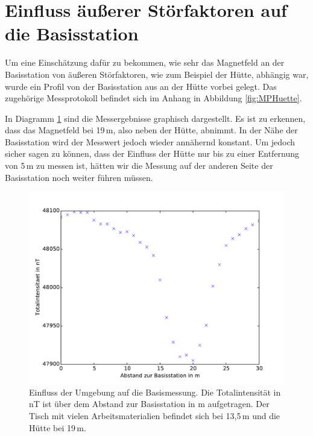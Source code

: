 \section{Einfluss äußerer Störfaktoren auf die Basisstation}

Um eine Einschätzung dafür zu bekommen, wie sehr das Magnetfeld an der Basisstation von äußeren Störfaktoren, wie zum Beispiel der Hütte, abhängig war, wurde ein Profil von der Basisstation aus an der Hütte vorbei gelegt. Das zugehörige Messprotokoll befindet sich im Anhang in Abbildung \ref{fig:MPHuette}.

In Diagramm \ref{fig:plot_huette} sind die Messergebnisse graphisch dargestellt. Es ist zu erkennen, dass das Magnetfeld bei 19\,m, also neben der Hütte, abnimmt. In der Nähe der Basisstation wird der Messwert jedoch wieder annähernd konstant. Um jedoch sicher sagen zu können, dass der Einfluss der Hütte nur bis zu einer Entfernung von 5\,m zu messen ist, hätten wir die Messung auf der anderen Seite der Basisstation noch weiter führen müssen.

\begin{figure}[!ht]
 \centering
 \includegraphics[width=\textwidth]{fig/plot_huette.pdf}
 \caption[Einfluss der Umgebung auf die Basismessung]{Einfluss der Umgebung auf die Basismessung. Die Totalintensität in nT ist über dem Abstand zur Basisstation in m aufgetragen. Der Tisch mit vielen Arbeitsmaterialien befindet sich bei 13,5\,m und die Hütte bei 19\,m.}
 \label{fig:plot_huette}
\end{figure}


